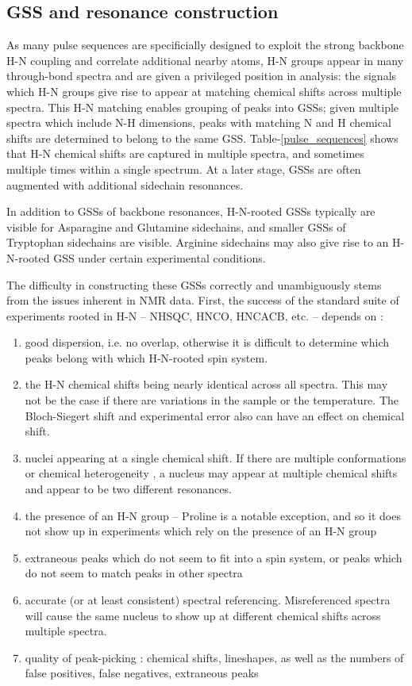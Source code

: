 \subsection{GSS and resonance construction}
As many pulse sequences are specificially designed to exploit the strong
backbone H-N coupling and correlate additional nearby atoms, H-N groups appear 
in many through-bond spectra and are given a privileged position in analysis: 
the signals which H-N groups give rise to appear at matching chemical shifts
across multiple spectra.
This H-N matching enables grouping of peaks into GSSs; given multiple spectra
which include N-H dimensions, peaks with matching N and H chemical shifts are
determined to belong to the same GSS.
Table-\ref{pulse_sequences} shows that H-N chemical shifts are captured in 
multiple spectra, and sometimes multiple times within a single spectrum.
At a later stage, GSSs are often augmented with additional sidechain resonances.
	
In addition to GSSs of backbone resonances, H-N-rooted GSSs typically are 
visible for Asparagine and Glutamine sidechains, and smaller GSSs of 
Tryptophan sidechains are visible.  Arginine sidechains may also give rise 
to an H-N-rooted GSS under certain experimental conditions. 

The difficulty in constructing these GSSs correctly and unambiguously stems 
from the issues inherent in NMR data.  First, the success of the standard 
suite of experiments rooted in H-N -- NHSQC, HNCO, HNCACB, etc. -- depends 
on \cite{autoassign1997}: %
\begin{enumerate}
  \item good dispersion, i.e. no overlap, otherwise it is difficult to determine 
    which peaks belong with which H-N-rooted spin system.
  \item the H-N chemical shifts being nearly identical across all spectra.  
    This may not be the case if there are variations in the sample or the 
    temperature.  The Bloch-Siegert shift and experimental error also can have 
    an effect on chemical shift.
  \item nuclei appearing at a single chemical shift.  If there are multiple 
    conformations or chemical heterogeneity \cite{autoassign1997}, 
    a nucleus may appear at multiple chemical shifts and appear to be two 
    different resonances.
  \item the presence of an H-N group -- Proline is a notable exception, and 
    so it does not show up in experiments which rely on the presence of an H-N group
  \item extraneous peaks which do not seem to fit into a spin system, or 
    peaks which do not seem to match peaks in other spectra
  \item accurate (or at least consistent) spectral referencing.  
    Misreferenced spectra will cause the same nucleus to show up at different 
    chemical shifts across multiple spectra.
  \item quality of peak-picking \cite{autoassign1997, mars}: 
    chemical shifts, lineshapes, as well as the numbers of 
    false positives, false negatives, extraneous peaks
\end{enumerate}

